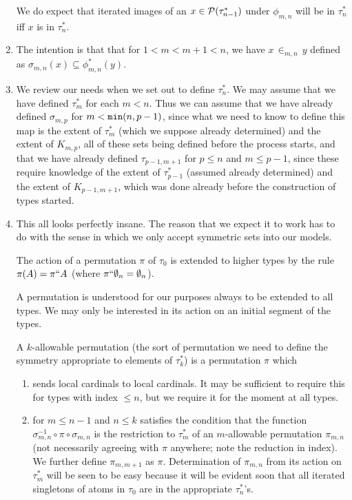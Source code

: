 \documentclass[12pt]{article}
\begin{document}
\begin{enumerate}
We do expect that iterated images of an $x \in {\cal P}(\tau^*_{n-1})$ under $\phi_{m,n}$ will be in $\tau^*_n$ iff $x$ is in $\tau^*_n$.

\item  The intention is that that for $1<m<m+1<n$, we have $x \, \in_{m,n} \, y$ defined as $\sigma_{m,n}(x) \subseteq \phi^*_{m,n}(y)$.

\item  We review our needs when we set out to define $\tau^*_n$.  We may assume that we have defined $\tau^*_m$ for each $m<n$.  Thus we can assume that we have already defined $\sigma_{m,p}$ for $m<{\tt min}(n,p-1)$, since what we need to know
to define this map is the extent of $\tau^*_m$ (which we suppose already determined) and the extent of $K_{m,p}$, all of these sets being defined before the process starts, and that we have already defined $\tau_{p-1,m+1}$ for $p \leq n$ and $m \leq p-1$, since these require knowledge
of the extent of $\tau^*_{p-1}$ (assumed already determined) and the extent of $K_{p-1,m+1}$, which was done already before the construction of types started.

\item This all looks perfectly insane.  The reason that we expect it to work has to do with the sense in which we only accept symmetric sets into our models.

The action of a permutation $\pi$ of $\tau_0$ is extended to higher types by the rule $\pi(A) = \pi``A$ (where $\pi``\emptyset_n = \emptyset_n$).

A permutation is understood for our purposes always to be extended to all types.   We may only be interested in its action on an initial segment of the types.

A $k$-allowable permutation (the sort of permutation we need to define the symmetry appropriate to elements of $\tau^*_k$) is a permutation $\pi$ which 

\begin{enumerate}

\item sends local cardinals to local cardinals.  It may be sufficient to require this for types with index $\leq n$, but we require it for the moment at all types.

\item for $m \leq n-1$ and $n\leq k$ satisfies the condition that the function $\sigma_{m,n}^{-1} \circ \pi \circ \sigma_{m,n}$ is the restriction to $\tau^*_m$ of  an $m$-allowable permutation $\pi_{m,n}$  (not necessarily agreeing with $\pi$ anywhere; note the reduction in index).  We further define $\pi_{m,m+1}$ as $\pi$.  Determination of $\pi_{m,n}$ from its action on $\tau^*_m$ will be seen to be easy because it will be evident soon that all iterated singletons of atoms in $\tau_0$ are in the appropriate $\tau^*_n$'s.


\end{enumerate}
\end{enumerate}
\end{document}
